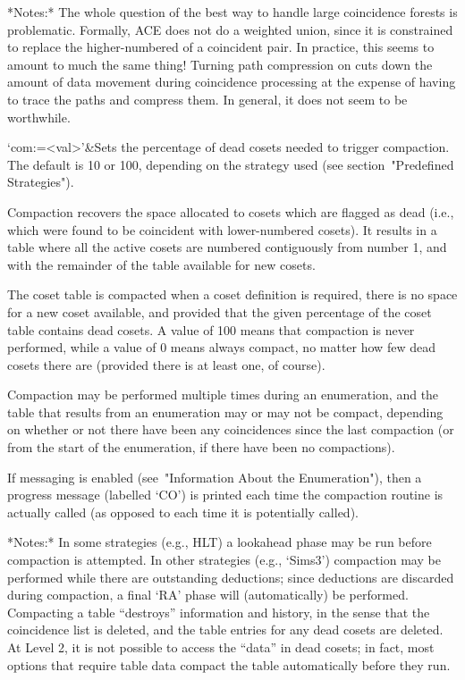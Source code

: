 *Notes:*
The whole question of the best way to handle large coincidence forests is
  problematic.
Formally, ACE does not do a weighted union, since it is constrained to
  replace the higher-numbered of a coincident pair.
In practice, this seems to amount to much the same thing!
Turning path compression on cuts down the amount of data movement during
  coincidence processing at the expense of having to trace the paths and
  compress them.
In general, it does not seem to be worthwhile.

`com:=<val>'&Sets the percentage of dead cosets needed to trigger
compaction. The default is 10 or 100, depending on the strategy used
(see section~"Predefined Strategies").

Compaction recovers the space allocated to cosets which are flagged as dead
(i.e., which were found to be coincident with lower-numbered cosets).  It
results in a table where all the active cosets are numbered contiguously
from number 1, and with the remainder of the table available for new cosets.

The coset table is compacted when a coset definition is required, there is
no space for a new coset available, and provided that the given percentage
of the coset table contains dead cosets.  A value of 100 means that
compaction is never performed, while a value of 0 means always compact,
no matter how few dead cosets there are (provided there is at least one, of
course).

Compaction may be performed multiple times during an enumeration, and the
table that results from an enumeration may or may not be compact, depending
on whether or not there have been any coincidences since the last compaction
(or from the start of the enumeration, if there have been no compactions).

If messaging is enabled (see~"Information About the Enumeration"), then a
progress message (labelled `CO') is printed each time the compaction routine
is actually called (as opposed to each time it is potentially called).

*Notes:*
In some strategies (e.g., HLT) a lookahead phase may be run before
compaction is attempted.  In other strategies (e.g., `Sims3') compaction may
be performed while there are outstanding deductions; since deductions are
discarded during compaction, a final `RA' phase will (automatically) be
performed.
%
Compacting a table ``destroys'' information and history, in the sense that
the coincidence list is deleted, and the table entries for any dead cosets
are deleted.  At Level 2, it is not possible to access the ``data'' in dead
cosets; in fact, most options that require table data compact the table
automatically before they run.

